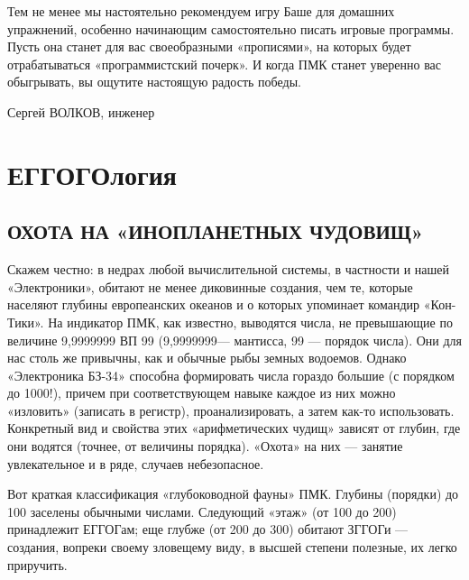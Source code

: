 \documentclass[11pt,a4paper,oneside]{article}
\begin{document}
Тем не менее мы настоятельно рекомендуем игру Баше для домашних упражнений, особенно начинающим самостоятельно писать игровые программы. Пусть она станет для вас своеобразными «прописями», на которых будет отрабатываться «программистский почерк». И когда ПМК станет уверенно вас обыгрывать, вы ощутите настоящую радость победы.

Сергей ВОЛКОВ, инженер


\section{ЕГГОГОлогия}

\subsection{ОХОТА НА «ИНОПЛАНЕТНЫХ ЧУДОВИЩ»}

Скажем честно: в недрах любой вычислительной системы, в частности и нашей «Электроники», обитают не менее диковинные создания, чем те, которые населяют глубины европеанских океанов и о которых упоминает командир «Кон-Тики». На индикатор ПМК, как известно, выводятся числа, не превышающие по величине 9,9999999 ВП 99 (9,9999999— мантисса, 99 — порядок числа). Они для нас столь же привычны, как и обычные рыбы земных водоемов. Однако «Электроника БЗ-34» способна формировать числа гораздо большие (с порядком до 1000!), причем при соответствующем навыке каждое из них можно «изловить» (записать в регистр), проанализировать, а затем как-то использовать. Конкретный вид и свойства этих «арифметических чудищ» зависят от глубин, где они водятся (точнее, от величины порядка). «Охота» на них — занятие увлекательное и в ряде, случаев небезопасное.

Вот краткая классификация «глубоководной фауны» ПМК. Глубины (порядки) до 100 заселены обычными числами. Следующий «этаж» (от 100 до 200) принадлежит ЕГГОГам; еще глубже (от 200 до 300) обитают ЗГГОГи — создания, вопреки своему зловещему виду, в высшей степени полезные, их легко приручить.
\end{document}
